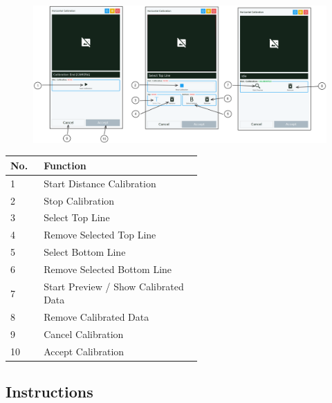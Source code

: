 \begin{figure}[H]
    \centering
    \includegraphics[width=\textwidth]{texs/chapter1/image/p4.png}
\end{figure}

\begin{table}[!ht]
    \centering
    \begin{tabular}{p{0.05\linewidth} | p{0.5\linewidth}}
        \hline
        \textbf{No.} & \textbf{Function}                    \\ \hline
        1            & Start Distance Calibration           \\ \hline
        2            & Stop Calibration                     \\ \hline
        3            & Select Top Line                      \\ \hline
        4            & Remove Selected Top Line             \\ \hline
        5            & Select Bottom Line                   \\ \hline
        6            & Remove Selected Bottom Line          \\ \hline
        7            & Start Preview / Show Calibrated Data \\ \hline
        8            & Remove Calibrated Data               \\ \hline
        9            & Cancel Calibration                   \\ \hline
        10           & Accept Calibration                   \\ \hline
    \end{tabular}
\end{table}

\subsection{Instructions}

